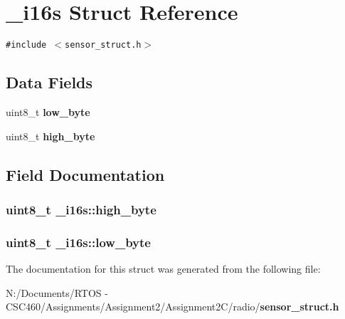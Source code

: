\section{\_\-i16s Struct Reference}
\label{struct__i16s}
{\tt \#include $<$sensor\_\-struct.h$>$}

\subsection*{Data Fields}
\begin{CompactItemize}
\item 
uint8\_\-t {\bf low\_\-byte}
\item 
uint8\_\-t {\bf high\_\-byte}
\end{CompactItemize}


\subsection{Field Documentation}
\subsubsection{\setlength{\rightskip}{0pt plus 5cm}uint8\_\-t {\bf \_\-i16s::high\_\-byte}}\label{struct__i16s_a8a61d2aeb8880eb3c903e3ea8fe7c86}


\subsubsection{\setlength{\rightskip}{0pt plus 5cm}uint8\_\-t {\bf \_\-i16s::low\_\-byte}}\label{struct__i16s_849dad8b0ef3f9c203c2b661b803b5aa}




The documentation for this struct was generated from the following file:\begin{CompactItemize}
\item 
N:/Documents/RTOS - CSC460/Assignments/Assignment2/Assignment2C/radio/{\bf sensor\_\-struct.h}\end{CompactItemize}
